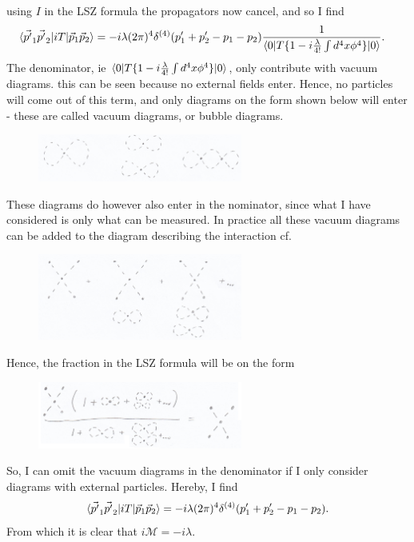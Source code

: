 \begin{example}
\begin{enumerate}
		using $I$ in the LSZ formula the propagators now cancel, and so I find
		\begin{equation}
			\begin{split}
				\braket{\vec{p'}_1\vec{p'}_2|iT|\vec{p}_1\vec{p}_2}&=-i\lambda (2\pi)^4\delta^{(4)}(p'_1+p'_2-p_1-p_2)\frac{1}{\braket{0|T\{1-i\frac{\lambda}{4!}\int d^4x \phi^4\}|0}}.
			\end{split}
		\end{equation} 
		The denominator, ie $\braket{0|T\{1-i\frac{\lambda}{4!}\int d^4x \phi^4\}|0}$, only contribute with vacuum diagrams. this can be seen because no external fields enter. Hence, no particles will come out of this term, and only diagrams on the form shown below will enter - these are called vacuum diagrams, or bubble diagrams.
		\begin{figure}[H]
			\captionsetup{width=1\textwidth}
			\centering
			\includegraphics[width=0.6\textwidth]{figures/bub1}
		\end{figure}
		These diagrams do however also enter in the nominator, since what I have considered is only what can be measured. In practice all these vacuum diagrams can be added to the diagram describing the interaction cf.
		\begin{figure}[H]
			\captionsetup{width=1\textwidth}
			\centering
			\includegraphics[width=0.6\textwidth]{figures/bub2}
		\end{figure}
		Hence, the fraction in the LSZ formula will be on the form
		\begin{figure}[H]
			\captionsetup{width=1\textwidth}
			\centering
			\includegraphics[width=0.6\textwidth]{figures/bub3}
		\end{figure}
		So, I can omit the vacuum diagrams in the denominator if I only consider diagrams with external particles. Hereby, I find
		\begin{equation}
			\braket{\vec{p'}_1\vec{p'}_2|iT|\vec{p}_1\vec{p}_2}=-i\lambda (2\pi)^4\delta^{(4)}(p'_1+p'_2-p_1-p_2).
		\end{equation} 
		From which it is clear that $i\mathcal{M}=-i\lambda$.
		

\end{enumerate}
\end{example}

